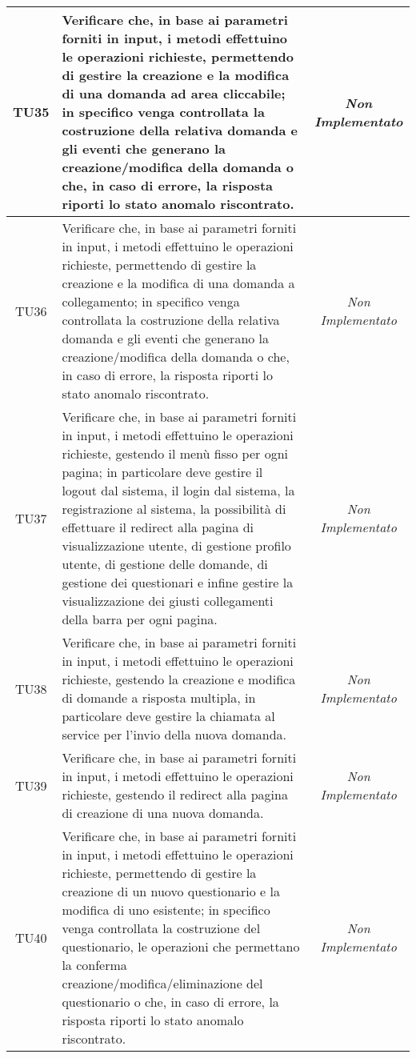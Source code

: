 \begin{longtable}{|c|>{}m{10cm}|c|}
\hypertarget{TU35}{TU35} & Verificare che, in base ai parametri forniti in input, i metodi effettuino le operazioni richieste, permettendo di gestire la creazione e la modifica di una domanda ad area cliccabile; in specifico venga controllata la costruzione della relativa domanda e gli eventi che generano la creazione/modifica della domanda  o che, in caso di errore, la risposta riporti lo stato anomalo riscontrato. & \textit{Non Implementato}\\ \hline
\hypertarget{TU36}{TU36} & Verificare che, in base ai parametri forniti in input, i metodi effettuino le operazioni richieste, permettendo di gestire la creazione e la modifica di una domanda a collegamento; in specifico venga controllata la costruzione della relativa domanda e gli eventi che generano la creazione/modifica della domanda o che, in caso di errore, la risposta riporti lo stato anomalo riscontrato. & \textit{Non Implementato}\\ \hline
\hypertarget{TU37}{TU37} & Verificare che, in base ai parametri forniti in input, i metodi effettuino le operazioni richieste, gestendo il menù fisso per ogni pagina; in particolare deve gestire il logout dal sistema, il login dal sistema, la registrazione al sistema, la possibilità di effettuare il redirect alla pagina di visualizzazione utente, di gestione profilo utente, di gestione delle domande, di gestione dei questionari e infine gestire la visualizzazione dei giusti collegamenti della barra per ogni pagina. & \textit{Non Implementato}\\ \hline
\hypertarget{TU38}{TU38} & Verificare che, in base ai parametri forniti in input, i metodi effettuino le operazioni richieste, gestendo la creazione e modifica di domande a risposta multipla, in particolare deve gestire la chiamata al service per l'invio della nuova domanda. & \textit{Non Implementato}\\ \hline
\hypertarget{TU39}{TU39} & Verificare che, in base ai parametri forniti in input, i metodi effettuino le operazioni richieste, gestendo il redirect alla pagina di creazione di una nuova domanda. & \textit{Non Implementato}\\ \hline
\hypertarget{TU40}{TU40} & Verificare che, in base ai parametri forniti in input, i metodi effettuino le operazioni richieste, permettendo di gestire la creazione di un nuovo questionario e la modifica di uno esistente; in specifico venga controllata la costruzione del questionario, le operazioni che permettano la conferma creazione/modifica/eliminazione del questionario o che, in caso di errore, la risposta riporti lo stato anomalo riscontrato. & \textit{Non Implementato}\\ \hline

\end{longtable}
